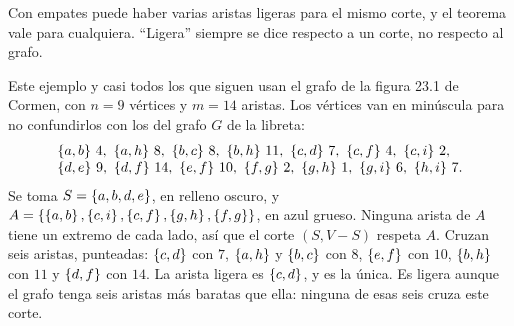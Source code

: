 \documentclass[11pt,letterpaper]{article}
\begin{document}
Con empates puede haber varias aristas ligeras para el mismo corte, y
el teorema vale para cualquiera. ``Ligera'' siempre se dice respecto a
un corte, no respecto al grafo.

\begin{ejemplo}
  \label{ej:corte-cormen-mst}
  Este ejemplo y casi todos los que siguen usan el grafo de la figura
  23.1 de Cormen, con $n = 9$ vértices y $m = 14$ aristas. Los
  vértices van en minúscula para no confundirlos con los del grafo
  $G$ de la libreta:
  \[
    \begin{array}{l}
      \left\{ a,b \right\}\,4,\ \left\{ a,h \right\}\,8,\ \left\{ b,c \right\}\,8,\ \left\{ b,h \right\}\,11,\
      \left\{ c,d \right\}\,7,\ \left\{ c,f \right\}\,4,\ \left\{ c,i \right\}\,2, \\
      \left\{ d,e \right\}\,9,\ \left\{ d,f \right\}\,14,\ \left\{ e,f \right\}\,10,\ \left\{ f,g \right\}\,2,\
      \left\{ g,h \right\}\,1,\ \left\{ g,i \right\}\,6,\ \left\{ h,i \right\}\,7 .
    \end{array}
  \]
  Se toma $S = \left\{ a, b, d, e \right\}$, en relleno oscuro, y
  $A = \left\{ \left\{ a,b \right\}, \left\{ c,i \right\}, \left\{ c,f \right\}, \left\{ g,h \right\}, \left\{ f,g \right\} \right\}$,
  en azul grueso. Ninguna arista de $A$ tiene un extremo de cada lado,
  así que el corte $(S, V - S)$ respeta $A$. Cruzan seis aristas,
  punteadas: $\left\{ c,d \right\}$ con $7$, $\left\{ a,h \right\}$ y $\left\{ b,c \right\}$ con $8$,
  $\left\{ e,f \right\}$ con $10$, $\left\{ b,h \right\}$ con $11$ y $\left\{ d,f \right\}$ con $14$.
  La arista ligera es $\left\{ c, d \right\}$, y es la única. Es ligera aunque el
  grafo tenga seis aristas más baratas que ella: ninguna de esas seis
  cruza este corte.
  \begin{center}
  \end{center}
\end{ejemplo}
\end{document}
